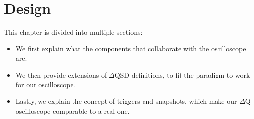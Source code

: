 \chapter{Design}
    This chapter is divided into multiple sections:
    \begin{itemize}
        \item We first explain what the components that collaborate with the oscilloscope are.
        \item We then provide extensions of $\Delta$QSD definitions, to fit the paradigm to work for our oscilloscope.
        \item Lastly, we explain the concept of triggers and snapshots, which make our $\Delta$Q oscilloscope comparable to a real one.
    \end{itemize}

    
    
    
    
    

